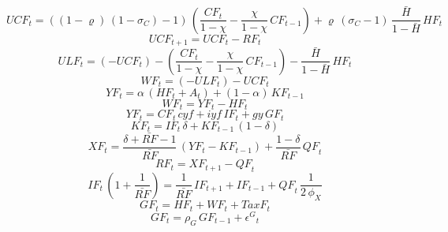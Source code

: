 \begin{dmath}
{UCF}_{t}=\left(\left(1-{{\varrho}}\right)\, \left(1-{{\sigma_{C}}}\right)-1\right)\, \left(\frac{{CF}_{t}}{1-{{\chi}}}-\frac{{{\chi}}}{1-{{\chi}}}\, {CF}_{t-1}\right)+{{\varrho}}\, \left({{\sigma_{C}}}-1\right)\, \frac{{{\bar{H}}}}{1-{{\bar{H}}}}\, {HF}_{t}
\end{dmath}
\begin{dmath}
{UCF}_{t+1}={UCF}_{t}-{RF}_{t}
\end{dmath}
\begin{dmath}
{ULF}_{t}=\left(-{UCF}_{t}\right)-\left(\frac{{CF}_{t}}{1-{{\chi}}}-\frac{{{\chi}}}{1-{{\chi}}}\, {CF}_{t-1}\right)-\frac{{{\bar{H}}}}{1-{{\bar{H}}}}\, {HF}_{t}
\end{dmath}
\begin{dmath}
{WF}_{t}=\left(-{ULF}_{t}\right)-{UCF}_{t}
\end{dmath}
\begin{dmath}
{YF}_{t}={{\alpha}}\, \left({HF}_{t}+{A}_{t}\right)+\left(1-{{\alpha}}\right)\, {KF}_{t-1}
\end{dmath}
\begin{dmath}
{WF}_{t}={YF}_{t}-{HF}_{t}
\end{dmath}
\begin{dmath}
{YF}_{t}={CF}_{t}\, {{cyf}}+{{iyf}}\, {IF}_{t}+{{gy}}\, {GF}_{t}
\end{dmath}
\begin{dmath}
{KF}_{t}={IF}_{t}\, {{\delta}}+{KF}_{t-1}\, \left(1-{{\delta}}\right)
\end{dmath}
\begin{dmath}
{XF}_{t}=\frac{{{\delta}}+{{\bar{RF}}}-1}{{{\bar{RF}}}}\, \left({YF}_{t}-{KF}_{t-1}\right)+\frac{1-{{\delta}}}{{{\bar{RF}}}}\, {QF}_{t}
\end{dmath}
\begin{dmath}
{RF}_{t}={XF}_{t+1}-{QF}_{t}
\end{dmath}
\begin{dmath}
{IF}_{t}\, \left(1+\frac{1}{{{\bar{RF}}}}\right)=\frac{1}{{{\bar{RF}}}}\, {IF}_{t+1}+{IF}_{t-1}+{QF}_{t}\, \frac{1}{2\, {{\phi_{X}}}}
\end{dmath}
\begin{dmath}
{GF}_{t}={HF}_{t}+{WF}_{t}+{TaxF}_{t}
\end{dmath}
\begin{dmath}
{GF}_{t}={{\rho_{G}}}\, {GF}_{t-1}+{{\epsilon^{G}}}_{t}
\end{dmath}
